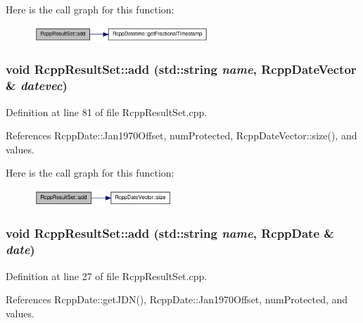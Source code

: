 Here is the call graph for this function:\nopagebreak
\begin{figure}[H]
\begin{center}
\leavevmode
\includegraphics[width=186pt]{classRcppResultSet_a1d921e7a24e50369ae67a1bc63826131_cgraph}
\end{center}
\end{figure}
\hypertarget{classRcppResultSet_ad7efd746596959ce68ca98c690a2f645}{
\subsubsection[{add}]{\setlength{\rightskip}{0pt plus 5cm}void RcppResultSet::add (std::string {\em name}, \/  {\bf RcppDateVector} \& {\em datevec})}}
\label{classRcppResultSet_ad7efd746596959ce68ca98c690a2f645}


Definition at line 81 of file RcppResultSet.cpp.

References RcppDate::Jan1970Offset, numProtected, RcppDateVector::size(), and values.

Here is the call graph for this function:\nopagebreak
\begin{figure}[H]
\begin{center}
\leavevmode
\includegraphics[width=148pt]{classRcppResultSet_ad7efd746596959ce68ca98c690a2f645_cgraph}
\end{center}
\end{figure}
\hypertarget{classRcppResultSet_ae5cb861a0d6e95cc7ed465ccae2ac4a7}{
\subsubsection[{add}]{\setlength{\rightskip}{0pt plus 5cm}void RcppResultSet::add (std::string {\em name}, \/  {\bf RcppDate} \& {\em date})}}
\label{classRcppResultSet_ae5cb861a0d6e95cc7ed465ccae2ac4a7}


Definition at line 27 of file RcppResultSet.cpp.

References RcppDate::getJDN(), RcppDate::Jan1970Offset, numProtected, and values.

